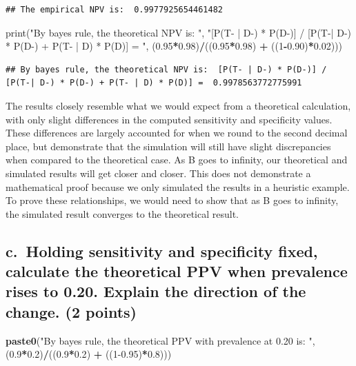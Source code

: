 \documentclass[
]{article}
\newenvironment{Shaded}{\begin{snugshade}}{\end{snugshade}}
\newcommand{\BuiltInTok}[1]{#1}
\newcommand{\DecValTok}[1]{\textcolor[rgb]{0.00,0.00,0.81}{#1}}
\newcommand{\FloatTok}[1]{\textcolor[rgb]{0.00,0.00,0.81}{#1}}
\newcommand{\FunctionTok}[1]{\textcolor[rgb]{0.13,0.29,0.53}{\textbf{#1}}}
\newcommand{\NormalTok}[1]{#1}
\newcommand{\OperatorTok}[1]{\textcolor[rgb]{0.81,0.36,0.00}{\textbf{#1}}}
\newcommand{\SpecialCharTok}[1]{\textcolor[rgb]{0.81,0.36,0.00}{\textbf{#1}}}
\newcommand{\StringTok}[1]{\textcolor[rgb]{0.31,0.60,0.02}{#1}}
\begin{document}
\begin{verbatim}
## The empirical NPV is:  0.9977925654461482
\end{verbatim}

\begin{Shaded}
\begin{Highlighting}[]
\BuiltInTok{print}\NormalTok{(}\StringTok{"By bayes rule, the theoretical NPV is: "}\NormalTok{, }\StringTok{"[P(T{-} | D{-}) * P(D{-})] / [P(T{-}| D{-}) * P(D{-}) + P(T{-} | D) * P(D)] = "}\NormalTok{, (}\FloatTok{0.95}\OperatorTok{*}\FloatTok{0.98}\NormalTok{)}\OperatorTok{/}\NormalTok{((}\FloatTok{0.95}\OperatorTok{*}\FloatTok{0.98}\NormalTok{) }\OperatorTok{+}\NormalTok{ ((}\DecValTok{1}\OperatorTok{{-}}\FloatTok{0.90}\NormalTok{)}\OperatorTok{*}\FloatTok{0.02}\NormalTok{)))}
\end{Highlighting}
\end{Shaded}

\begin{verbatim}
## By bayes rule, the theoretical NPV is:  [P(T- | D-) * P(D-)] / [P(T-| D-) * P(D-) + P(T- | D) * P(D)] =  0.9978563772775991
\end{verbatim}

The results closely resemble what we would expect from a theoretical
calculation, with only slight differences in the computed sensitivity
and specificity values. These differences are largely accounted for when
we round to the second decimal place, but demonstrate that the
simulation will still have slight discrepancies when compared to the
theoretical case. As B goes to infinity, our theoretical and simulated
results will get closer and closer. This does not demonstrate a
mathematical proof because we only simulated the results in a heuristic
example. To prove these relationships, we would need to show that as B
goes to infinity, the simulated result converges to the theoretical
result.

\subsection{c.~Holding sensitivity and specificity fixed, calculate the
theoretical PPV when prevalence rises to 0.20. Explain the direction of
the change. (2
points)}\label{c.-holding-sensitivity-and-specificity-fixed-calculate-the-theoretical-ppv-when-prevalence-rises-to-0.20.-explain-the-direction-of-the-change.-2-points}

\begin{Shaded}
\begin{Highlighting}[]
\FunctionTok{paste0}\NormalTok{(}\StringTok{"By bayes rule, the theoretical PPV with prevalence at 0.20 is: "}\NormalTok{, (}\FloatTok{0.9}\SpecialCharTok{*}\FloatTok{0.2}\NormalTok{)}\SpecialCharTok{/}\NormalTok{((}\FloatTok{0.9}\SpecialCharTok{*}\FloatTok{0.2}\NormalTok{) }\SpecialCharTok{+}\NormalTok{ ((}\DecValTok{1}\FloatTok{{-}0.95}\NormalTok{)}\SpecialCharTok{*}\FloatTok{0.8}\NormalTok{)))}
\end{Highlighting}
\end{Shaded}
\end{document}
